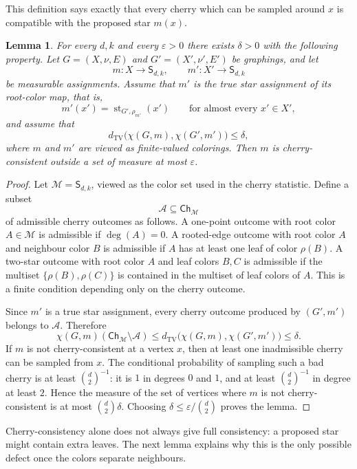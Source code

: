 \documentclass[11pt]{amsart}
\newcommand{\TV}{\operatorname{TV}}
\newtheorem{lemma}[theorem]{Lemma}
\theoremstyle{remark}
\begin{document}
This definition says exactly that every cherry which can be sampled around $x$ is compatible with the proposed star $m(x)$.

\begin{lemma}\label{lem:cherry-test-consistency}
For every $d,k$ and every $\varepsilon>0$ there exists $\delta>0$ with the following property. Let $G=(X,\nu,E)$ and $G'=(X',\nu',E')$ be graphings, and let
\[
 m\colon X\to\mathsf S_{d,k},\qquad m'\colon X'\to\mathsf S_{d,k}
\]
be measurable assignments. Assume that $m'$ is the true star assignment of its root-color map, that is,
\[
 m'(x')=\operatorname{st}_{G',\rho_{m'}}(x')
 \qquad\text{for almost every }x'\in X',
\]
and assume that
\[
 d_{\TV}\bigl(\chi(G,m),\chi(G',m')\bigr)\leq\delta,
\]
where $m$ and $m'$ are viewed as finite-valued colorings. Then $m$ is cherry-consistent outside a set of measure at most $\varepsilon$.
\end{lemma}

\begin{proof}
Let $\mathcal M=\mathsf S_{d,k}$, viewed as the color set used in the cherry statistic.  Define a subset
\[
 \mathcal A\subseteq \mathsf{Ch}_{\mathcal M}
\]
of admissible cherry outcomes as follows.  A one-point outcome with root color $A\in\mathcal M$ is admissible if $\deg(A)=0$.  A rooted-edge outcome with root color $A$ and neighbour color $B$ is admissible if $A$ has at least one leaf of color $\rho(B)$.  A two-star outcome with root color $A$ and leaf colors $B,C$ is admissible if the multiset $\{\rho(B),\rho(C)\}$ is contained in the multiset of leaf colors of $A$.  This is a finite condition depending only on the cherry outcome.

Since $m'$ is a true star assignment, every cherry outcome produced by $(G',m')$ belongs to $\mathcal A$.  Therefore
\[
 \chi(G,m)(\mathsf{Ch}_{\mathcal M}\setminus\mathcal A)\leq
 d_{\TV}\bigl(\chi(G,m),\chi(G',m')\bigr)\leq\delta.
\]
If $m$ is not cherry-consistent at a vertex $x$, then at least one inadmissible cherry can be sampled from $x$.  The conditional probability of sampling such a bad cherry is at least $\binom d2^{-1}$: it is $1$ in degrees $0$ and $1$, and at least $\binom d2^{-1}$ in degree at least $2$.  Hence the measure of the set of vertices where $m$ is not cherry-consistent is at most $\binom d2\delta$.  Choosing $\delta\leq \varepsilon/\binom d2$ proves the lemma.
\end{proof}

Cherry-consistency alone does not always give full consistency: a proposed star might contain extra leaves. The next lemma explains why this is the only possible defect once the colors separate neighbours.
\end{document}
